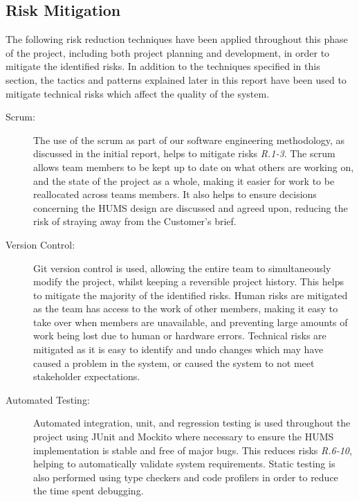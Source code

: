\documentclass[10pt,a4paper]{article}
\begin{document}
\subsection{Risk Mitigation}
The following risk reduction techniques have been applied throughout this phase of the project, including both project planning and development, in order to mitigate the identified risks. In addition to the techniques specified in this section, the tactics and patterns explained later in this report have been used to mitigate technical risks which affect the quality of the system.
\begin{description}
\item[Scrum:]
The use of the scrum as part of our software engineering methodology, as discussed in the initial report, helps to mitigate risks \emph{R.1-3}. The scrum allows team members to be kept up to date on what others are working on, and the state of the project as a whole, making it easier for work to be reallocated across teams members. It also helps to ensure decisions concerning the HUMS design are discussed and agreed upon, reducing the risk of straying away from the Customer's brief.

\item[Version Control:]
Git version control is used, allowing the entire team to simultaneously modify the project, whilst keeping a reversible project history. This helps to mitigate the majority of the identified risks. Human risks are mitigated as the team has access to the work of other members, making it easy to take over when members are unavailable, and preventing large amounts of work being lost due to human or hardware errors. Technical risks are mitigated as it is easy to identify and undo changes which may have caused a problem in the system, or caused the system to not meet stakeholder expectations.

\item[Automated Testing:] 
Automated integration, unit, and regression testing is used throughout the project using JUnit and Mockito where necessary to ensure the HUMS implementation is stable and free of major bugs. This reduces risks \emph{R.6-10}, helping to automatically validate system requirements. 
Static testing is also performed using type checkers and code profilers in order to reduce the time spent debugging. %
\end{description}

\end{document}
